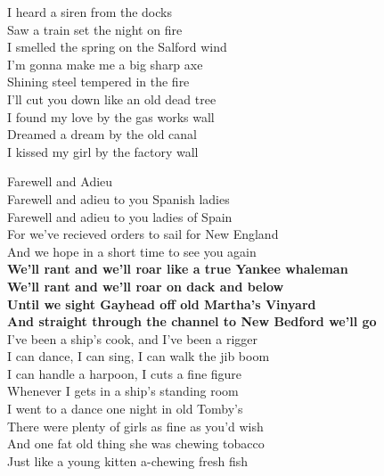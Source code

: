 \documentclass[letterpaper,9pt]{article}
\begin{document}
I heard a siren from the docks \\
Saw a train set the night on fire \\
I smelled the spring on the Salford wind \\

I'm gonna make me a big sharp axe \\
Shining steel tempered in the fire \\
I'll cut you down like an old dead tree \\

I found my love by the gas works wall \\
Dreamed a dream by the old canal \\
I kissed my girl by the factory wall \\

\newpage
{}
\Huge
Farewell and Adieu\\

\LARGE
Farewell and adieu to you Spanish ladies \\
Farewell and adieu to you ladies of Spain \\
For we’ve recieved orders to sail for New England \\
And we hope in a short time to see you again \\

\textbf{We’ll rant and we’ll roar like a true Yankee whaleman \\
We’ll rant and we’ll roar on dack and below \\
Until we sight Gayhead off old Martha’s Vinyard \\
And straight through the channel to New Bedford we’ll go} \\

I’ve been a ship’s cook, and I’ve been a rigger \\
I can dance, I can sing, I can walk the jib boom \\
I can handle a harpoon, I cuts a fine figure  \\
Whenever I gets in a ship’s standing room \\

I went to a dance one night in old Tomby’s \\
There were plenty of girls as fine as you’d wish \\
And one fat old thing she was chewing tobacco \\
Just like a young kitten a-chewing fresh fish \\
\end{document}
